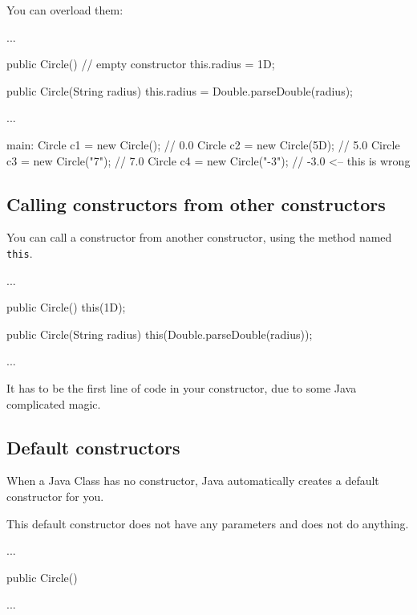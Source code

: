 \documentclass[a4paper, 9pt]{extarticle}
\begin{document}
You can overload them:

\begin{blackboard}
  ...

  public Circle() {          // empty constructor
    this.radius = 1D;
  }

  public Circle(String radius) {
    this.radius = Double.parseDouble(radius);
  }

  ...

main:
  Circle c1 = new Circle(); // 0.0
  Circle c2 = new Circle(5D); // 5.0
  Circle c3 = new Circle("7"); // 7.0
  Circle c4 = new Circle("-3"); // -3.0 <-- this is wrong
\end{blackboard}










\subsection{Calling constructors from other constructors}

You can call a constructor from another constructor, using the method named
\verb+this+.

\begin{blackboard}

  ...

  public Circle() {
    this(1D);
  }

  public Circle(String radius) {
    this(Double.parseDouble(radius));
  }

  ...

\end{blackboard}

It has to be the first line of code in your constructor, due to some Java
complicated magic.









\subsection{Default constructors}

When a Java Class has no constructor, Java automatically creates a default
constructor for you.

This default constructor does not have any parameters and does not do anything.

\begin{blackboard}

  ...

  public Circle() {
  }

  ...

\end{blackboard}
\end{document}
